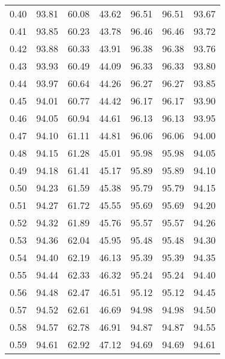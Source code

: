 \begin{tabular}{|c|c|c|c|c|c|c|}
      0.40 &     93.81 &     60.08 &      43.62 &   96.51 &      96.51 &         93.67 \\
      0.41 &     93.85 &     60.23 &      43.78 &   96.46 &      96.46 &         93.72 \\
      0.42 &     93.88 &     60.33 &      43.91 &   96.38 &      96.38 &         93.76 \\
      0.43 &     93.93 &     60.49 &      44.09 &   96.33 &      96.33 &         93.80 \\
      0.44 &     93.97 &     60.64 &      44.26 &   96.27 &      96.27 &         93.85 \\
      0.45 &     94.01 &     60.77 &      44.42 &   96.17 &      96.17 &         93.90 \\
      0.46 &     94.05 &     60.94 &      44.61 &   96.13 &      96.13 &         93.95 \\
      0.47 &     94.10 &     61.11 &      44.81 &   96.06 &      96.06 &         94.00 \\
      0.48 &     94.15 &     61.28 &      45.01 &   95.98 &      95.98 &         94.05 \\
      0.49 &     94.18 &     61.41 &      45.17 &   95.89 &      95.89 &         94.10 \\
      0.50 &     94.23 &     61.59 &      45.38 &   95.79 &      95.79 &         94.15 \\
      0.51 &     94.27 &     61.72 &      45.55 &   95.69 &      95.69 &         94.20 \\
      0.52 &     94.32 &     61.89 &      45.76 &   95.57 &      95.57 &         94.26 \\
      0.53 &     94.36 &     62.04 &      45.95 &   95.48 &      95.48 &         94.30 \\
      0.54 &     94.40 &     62.19 &      46.13 &   95.39 &      95.39 &         94.35 \\
      0.55 &     94.44 &     62.33 &      46.32 &   95.24 &      95.24 &         94.40 \\
      0.56 &     94.48 &     62.47 &      46.51 &   95.12 &      95.12 &         94.45 \\
      0.57 &     94.52 &     62.61 &      46.69 &   94.98 &      94.98 &         94.50 \\
      0.58 &     94.57 &     62.78 &      46.91 &   94.87 &      94.87 &         94.55 \\
      0.59 &     94.61 &     62.92 &      47.12 &   94.69 &      94.69 &         94.61 \\

\end{tabular}
